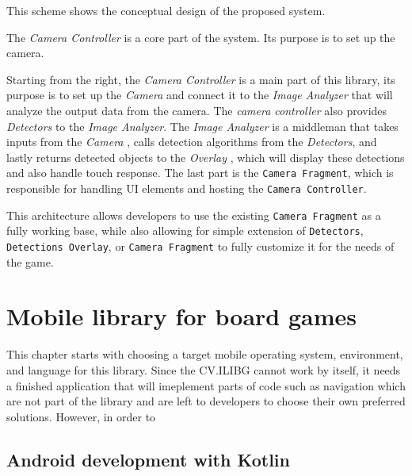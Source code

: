 This scheme shows the conceptual design of the proposed system.

The \textit{Camera Controller} is a core part of the system. Its purpose is to set up the camera.

Starting from the right, the \textit{Camera Controller} is a main part of this library, its purpose is to set up the \textit{Camera} and connect it to the \textit{Image Analyzer} that will analyze the output data from the camera. The \textit{camera controller} also provides \textit{Detectors} to the \textit{Image Analyzer}. The \textit{Image Analyzer} is a middleman that takes inputs from the \textit{Camera} , calls detection algorithms from the \textit{Detectors}, and lastly returns detected objects to the \textit{Overlay} , which will display these detections and also handle touch response. The last part is the \texttt{Camera Fragment}, which is responsible for handling UI elements and hosting the \texttt{Camera Controller}.

This architecture allows developers to use the existing \texttt{Camera Fragment} as a fully working base, while also allowing for simple extension of \texttt{Detectors}, \texttt{Detections Overlay}, or \texttt{Camera Fragment} to fully customize it for the needs of the game.



\chapter{Mobile library for board games}
This chapter starts with choosing a target mobile operating system, environment, and language for this library. Since the CV.ILIBG cannot work by itself, it needs a finished application that will imeplement parts of code such as navigation which are not part of the library and are left to developers to choose their own preferred solutions. However, in order to 




\section{Android development with Kotlin}
